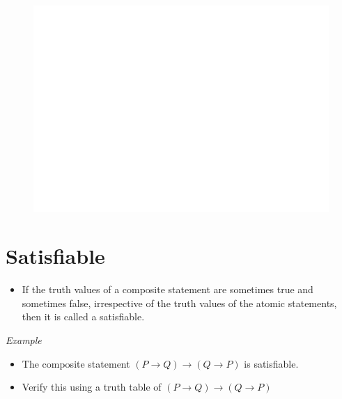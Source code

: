 \documentclass[]{book}
\providecommand{\tightlist}{%
  \setlength{\itemsep}{0pt}\setlength{\parskip}{0pt}}
\begin{document}
\begin{figure}

{\centering \includegraphics[width=1\linewidth]{figure/boxC36-1} 

}

\end{figure}

\hypertarget{satisfiable}{%
\section{Satisfiable}\label{satisfiable}}

\begin{itemize}
\tightlist
\item
  If the truth values of a composite statement are sometimes true and sometimes false, irrespective of the truth values of the atomic statements, then it is called a satisfiable.
\end{itemize}

\emph{Example}

\begin{itemize}
\tightlist
\item
  The composite statement \((P \rightarrow Q) \rightarrow (Q \rightarrow P)\) is satisfiable.
\item
  Verify this using a truth table of \((P \rightarrow Q) \rightarrow (Q \rightarrow P)\)
\end{itemize}
\end{document}
